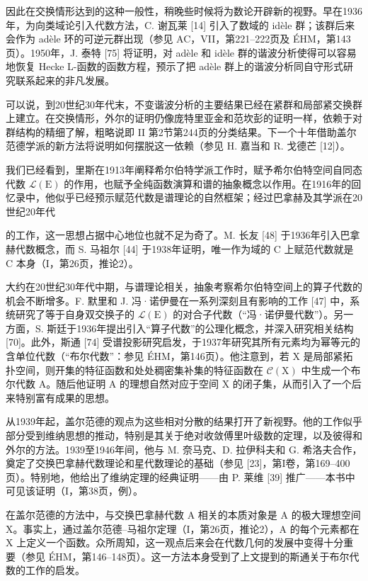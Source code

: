 因此在交换情形达到的这种一般性，稍晚些时候将为数论开辟新的视野。早在1936年，为向类域论引入代数方法，C. 谢瓦莱 {[}14{]} 引入了数域的 idèle 群；该群后来会作为 adèle 环的可逆元群出现（参见 AC，VII，第221--222页及 ÉHM，第143页）。1950年，J. 泰特 {[}75{]} 将证明，对 adèle 和 idèle 群的谐波分析使得可以容易地恢复 Hecke L-函数的函数方程，预示了把 adèle 群上的谐波分析同自守形式研究联系起来的非凡发展。

可以说，到20世纪30年代末，不变谐波分析的主要结果已经在紧群和局部紧交换群上建立。在交换情形，外尔的证明仍像庞特里亚金和范坎彭的证明一样，依赖于对群结构的精细了解，粗略说即 II 第2节第244页的分类结果。下一个十年借助盖尔范德学派的新方法将说明如何摆脱这一依赖（参见 H. 嘉当和 R. 戈德芒 {[}12{]}）。


我们已经看到，里斯在1913年阐释希尔伯特学派工作时，赋予希尔伯特空间自同态代数 \(\mathcal{L}(\mathrm{E})\) 的作用，也赋予全纯函数演算和谱的抽象概念以作用。在1916年的回忆录中，他似乎已经预示赋范代数是谱理论的自然框架；经过巴拿赫及其学派在20世纪20年代

的工作，这一思想占据中心地位也就不足为奇了。M. 长友 {[}48{]} 于1936年引入巴拿赫代数概念，而 S. 马祖尔 {[}44{]} 于1938年证明，唯一作为域的 C 上赋范代数就是 C 本身（I，第26页，推论2）。

大约在20世纪30年代中期，与谱理论相关，抽象考察希尔伯特空间上的算子代数的机会不断增多。F. 默里和 J. 冯·诺伊曼在一系列深刻且有影响的工作 {[}47{]} 中，系统研究了等于自身双交换子的 \(\mathcal{L}(\mathrm{E})\) 的对合子代数（“冯·诺伊曼代数”）。另一方面，S. 斯廷于1936年提出引入“算子代数”的公理化概念，并深入研究相关结构 {[}70{]}。此外，斯通 {[}74{]} 受谱投影研究启发，于1937年研究其所有元素均为幂等元的含单位代数（“布尔代数”：参见 ÉHM，第146页）。他注意到，若 X 是局部紧拓扑空间，则开集的特征函数和处处稠密集补集的特征函数在 \(\mathcal{C}(\mathrm{X})\) 中生成一个布尔代数 A。随后他证明 A 的理想自然对应于空间 X 的闭子集，从而引入了一个后来特别富有成果的思想。

从1939年起，盖尔范德的观点为这些相对分散的结果打开了新视野。他的工作似乎部分受到维纳思想的推动，特别是其关于绝对收敛傅里叶级数的定理，以及彼得和外尔的方法。1939至1946年间，他与 M. 奈马克、D. 拉伊科夫和 G. 希洛夫合作，奠定了交换巴拿赫代数理论和星代数理论的基础（参见 {[}23{]}，第I卷，第169--400页）。特别地，他给出了维纳定理的经典证明——由 P. 莱维 {[}39{]} 推广——本书中可见该证明（I，第38页，例）。

在盖尔范德的方法中，与交换巴拿赫代数 A 相关的本质对象是 A 的极大理想空间 X。事实上，通过盖尔范德--马祖尔定理（I，第26页，推论2），A 的每个元素都在 X 上定义一个函数。众所周知，这一观点后来会在代数几何的发展中变得十分重要（参见 ÉHM，第146--148页）。这一方法本身受到了上文提到的斯通关于布尔代数的工作的启发。

